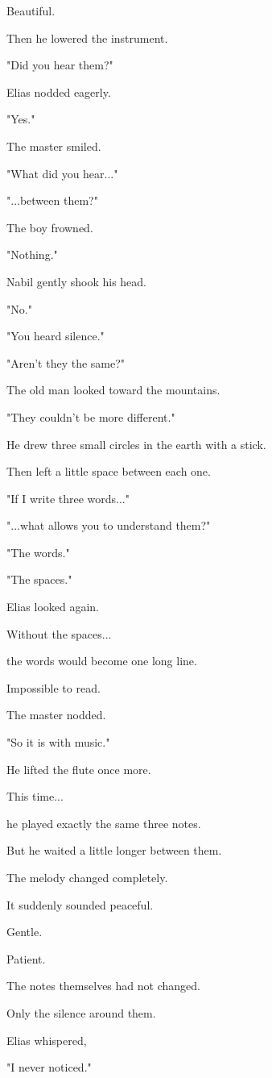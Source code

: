\documentclass[12pt,openany]{book}
\begin{document}
Beautiful.

Then he lowered the instrument.

"Did you hear them?"

Elias nodded eagerly.

"Yes."

The master smiled.

"What did you hear..."

"...between them?"

The boy frowned.

"Nothing."

Nabil gently shook his head.

"No."

"You heard silence."

"Aren't they the same?"

The old man looked toward the mountains.

"They couldn't be more different."

He drew three small circles in the earth with a stick.

Then left a little space between each one.

"If I write three words..."

"...what allows you to understand them?"

"The words."

"The spaces."

Elias looked again.

Without the spaces...

the words would become one long line.

Impossible to read.

The master nodded.

"So it is with music."

He lifted the flute once more.

This time...

he played exactly the same three notes.

But he waited a little longer between them.

The melody changed completely.

It suddenly sounded peaceful.

Gentle.

Patient.

The notes themselves had not changed.

Only the silence around them.

Elias whispered,

"I never noticed."
\end{document}
